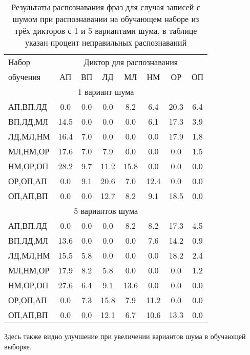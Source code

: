 \begin{table}[h]
	\centering
	\caption{Результаты распознавания фраз для случая записей с шумом при распознавании на обучающем наборе из трёх дикторов с 1 и 5 вариантами шума, в таблице указан процент неправильных распознаваний}
	\label{tab:cnn_phrases_3dictors_noises}
	\begin{tabular}{| l | c | c | c | c | c | c | c |}
		\hline
		Набор & \multicolumn{7}{c|}{Диктор для распознавания} \\
		\hhline{~-------}
		обучения \phantom{0000} & \phantom{0} АП \phantom{0} & \phantom{0} ВП \phantom{0} & \phantom{0} ЛД \phantom{0} & \phantom{0} МЛ \phantom{0} & \phantom{0} НМ \phantom{0} & \phantom{0} ОР \phantom{0} & \phantom{0} ОП \phantom{0} \\
		\hline
		\multicolumn{8}{|c|}{1 вариант шума} \\
		\hline
		АП,ВП,ЛД &  0.0 & 0.0 &  0.0 &  8.2 &  6.4 & 20.3 & 6.4 \\
		ВП,ЛД,МЛ & 14.5 & 0.0 &  0.0 &  0.0 &  6.1 & 17.3 & 3.9 \\
		ЛД,МЛ,НМ & 16.4 & 7.0 &  0.0 &  0.0 &  0.0 & 17.9 & 1.8 \\
		МЛ,НМ,ОР & 17.6 & 7.0 &  7.9 &  0.0 &  0.0 &  0.0 & 1.5 \\
		НМ,ОР,ОП & 28.2 & 9.7 & 11.2 & 15.8 &  0.0 &  0.0 & 0.0 \\
		ОР,ОП,АП &  0.0 & 9.1 & 20.6 &  7.0 & 12.4 &  0.0 & 0.0 \\
		ОП,АП,ВП &  0.0 & 0.0 & 12.7 &  8.2 &  9.1 & 18.5 & 0.0 \\
		\hline
		\multicolumn{8}{|c|}{5 вариантов шума} \\
		\hline
		АП,ВП,ЛД &  0.0 & 0.0 &  0.0 &  8.2 &  8.2 & 17.3 & 4.5 \\
		ВП,ЛД,МЛ & 13.6 & 0.0 &  0.0 &  0.0 &  7.6 & 14.2 & 0.9 \\
		ЛД,МЛ,НМ & 15.5 & 5.8 &  0.0 &  0.0 &  0.0 & 18.2 & 2.4 \\
		МЛ,НМ,ОР & 17.9 & 8.2 &  5.8 &  0.0 &  0.0 &  0.0 & 1.2 \\
		НМ,ОР,ОП & 27.6 & 6.4 &  9.1 & 13.6 &  0.0 &  0.0 & 0.0 \\
		ОР,ОП,АП &  0.0 & 7.3 & 15.8 &  7.9 & 11.2 &  0.0 & 0.0 \\
		ОП,АП,ВП &  0.0 & 0.0 & 12.1 &  6.7 & 10.6 & 13.3 & 0.0 \\
		\hline
	\end{tabular}
\end{table}

Здесь также видно улучшение при увеличении вариантов шума в обучающей выборке.

